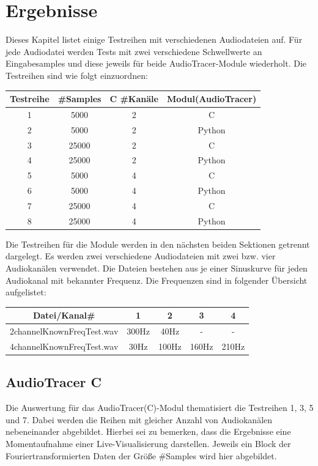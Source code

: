 
\section{Ergebnisse}
Dieses Kapitel listet einige Testreihen mit verschiedenen Audiodateien auf. Für jede Audiodatei werden Tests mit zwei verschiedene Schwellwerte an Eingabesamples und diese jeweils für beide AudioTracer-Module wiederholt.
Die Testreihen sind wie folgt einzuordnen:
\begin{table}[h!]
	\centering
	\begin{tabular}{|c | c | c | c|}
		\hline
		Testreihe & \#Samples & C \#Kanäle & Modul(AudioTracer)\\
		\hline\hline
		1		&	5000	&	2	&	C \\
		2		&	5000	&	2	&	Python \\
		3		&	25000	&	2	&	C \\
		4		&	25000	&	2	&	Python \\
		5		&	5000	&	4	&	C \\
		6		&	5000	&	4	&	Python \\
		7		&	25000	&	4	&	C \\												
		8		&	25000	&	4	&	Python \\
		\hline	
		
	\end{tabular}	
\end{table}

Die Testreihen für die Module werden in den nächsten beiden Sektionen getrennt dargelegt.
Es werden zwei verschiedene Audiodateien mit zwei bzw. vier Audiokanälen verwendet.
Die Dateien bestehen aus je einer Sinuskurve für jeden Audiokanal mit bekannter Frequenz. Die Frequenzen sind in folgender Übersicht aufgelistet:

\begin{table}[h!]
	\centering
	\begin{tabular}{|c | c | c | c | c |}		
		\hline
		Datei/Kanal\# & 1 & 2 & 3 & 4\\
		\hline\hline
		2channelKnownFreqTest.wav		&	300Hz & 40Hz & - & - \\
		4channelKnownFreqTest.wav		&	30Hz  &	100Hz	&	160Hz & 210Hz \\
		\hline	
		
	\end{tabular}	
\end{table}

\newpage

\subsection{AudioTracer C}
Die Auswertung für das AudioTracer(C)-Modul thematisiert die Testreihen 1, 3, 5 und 7.
Dabei werden die Reihen mit gleicher Anzahl von Audiokanälen nebeneinander abgebildet.
Hierbei sei zu bemerken, dass die Ergebnisse eine Momentaufnahme einer Live-Visualisierung darstellen. Jeweils ein Block der Fouriertransformierten Daten der Größe \#Samples wird hier abgebildet. 

